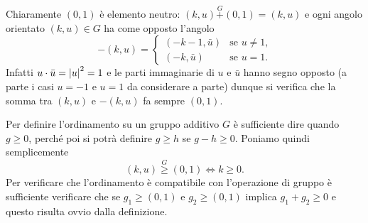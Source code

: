 Chiaramente $(0,1)$ è elemento neutro: 
$(k,u) \stackrel G+ (0,1) = (k,u)$
e ogni angolo orientato $(k,u)\in G$ ha come 
opposto l'angolo
\[
  -(k,u) = \begin{cases}
    (-k-1, \bar u) &\text{se $u\neq 1$,}\\
    (-k, \bar u) &\text{se $u=1$}.
  \end{cases} 
\]
Infatti $u\cdot \bar u = {\left|u\right|}^2 = 1$ e le parti 
immaginarie di $u$ e $\bar u$ hanno segno opposto (a parte i casi 
$u=-1$ e $u=1$ da considerare a parte) dunque 
si verifica che la somma tra $(k,u)$ e $-(k,u)$ fa sempre $(0,1)$.

Per definire l'ordinamento su un gruppo additivo $G$ 
è sufficiente dire quando $g\ge 0$, perché poi 
si potrà definire $g\ge h$ se $g-h\ge 0$.
Poniamo quindi semplicemente
\[
  (k,u) \stackrel G \ge (0,1) \iff k\ge 0.
\]
Per verificare che l'ordinamento è compatibile con 
l'operazione di gruppo è sufficiente verificare 
che se $g_1\ge (0,1)$ e $g_2\ge (0,1)$ implica 
$g_1 + g_2\ge 0$ e
questo risulta ovvio dalla definizione.

